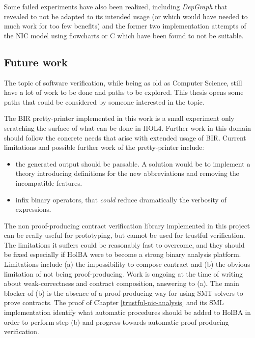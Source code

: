 \documentclass[10pt,a4paper]{article}
\begin{document}
\begin{multicols}{2}
Some failed experiments have also been realized, including \textit{DepGraph} that revealed to not be adapted to its intended usage (or which would have needed to much work for too few benefits) and the former two implementation attempts of the NIC model using flowcharts or C which have been found to not be suitable.

\subsection{Future work}

The topic of software verification, while being as old as Computer Science, still have a lot of work to be done and paths to be explored. This thesis opens some paths that could be considered by someone interested in the topic.

The BIR pretty-printer implemented in this work is a small experiment only scratching the surface of what can be done in HOL4. Further work in this domain should follow the concrete needs that arise with extended usage of BIR. Current limitations and possible further work of the pretty-printer include:

\begin{itemize}
    \item the generated output should be parsable. A solution would be to implement a theory introducing definitions for the new abbreviations and removing the incompatible features.
    \item infix binary operators, that \textit{could} reduce dramatically the verbosity of expressions.
\end{itemize}

\medskip
The non proof-producing contract verification library implemented in this project can be really useful for prototyping, but cannot be used for trustful verification. The limitations it suffers could be reasonably fast to overcome, and they should be fixed especially if HolBA were to become a strong binary analysis platform. Limitations include (a) the impossibility to compose contract and (b) the obvious limitation of not being proof-producing. Work is ongoing at the time of writing about weak-correctness and contract composition, answering to (a). The main blocker of (b) is the absence of a proof-producing way for using SMT solvers to prove contracts. The proof of Chapter \ref{trustful-nic-analysis} and its SML implementation identify what automatic procedures should be added to HolBA in order to perform step (b) and progress towards automatic proof-producing verification.


\end{multicols}

\renewcommand*{\bibfont}{\footnotesize}
\printbibliography
\end{document}
